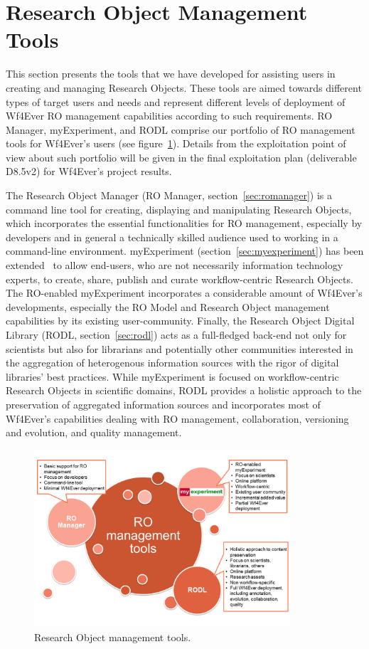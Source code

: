 \section{Research Object Management Tools}
\label{sec:romt}

This section presents the tools that we have developed for assisting users in creating and managing Research Objects. These tools are aimed towards different types of target users and needs and represent different levels of deployment of Wf4Ever RO management capabilities according to such requirements. RO Manager, myExperiment, and RODL comprise our portfolio of RO management tools for Wf4Ever's users (see figure~\ref{fig:romt}). Details from the exploitation point of view about such portfolio will be given in the final exploitation plan (deliverable D8.5v2) for Wf4Ever's project results.

The Research Object Manager (RO Manager, section~\ref{sec:romanager}) is a command line tool for creating, displaying and manipulating Research Objects, which incorporates the essential functionalities for RO management, especially by developers and in general a technically skilled audience used to working in a command-line environment. myExperiment (section~\ref{sec:myexperiment}) has been extended~\cite{DBLP:journals/fgcs/RoureGS09} to allow end-users, who are not necessarily information technology experts, to create, share, publish and curate workflow-centric Research Objects. The RO-enabled myExperiment incorporates a considerable amount of Wf4Ever's developments, especially the RO Model and Research Object management capabilities by its existing user-community. Finally, the Research Object Digital Library (RODL, section~\ref{sec:rodl}) acts as a full-fledged back-end not only for scientists but also for librarians and potentially other communities interested in the aggregation of heterogenous information sources with the rigor of digital libraries' best practices. While myExperiment is focused on workflow-centric Research Objects in scientific domains, RODL provides a holistic approach to the preservation of aggregated information sources and incorporates most of Wf4Ever's capabilities dealing with RO management, collaboration, versioning and evolution, and quality management. 


\begin{figure}
\begin{center}
\includegraphics[width=0.85\textwidth]{Figures/ROManagementTools-exploitation.png}
\end{center}
\caption{Research Object management tools.}
\label{fig:romt}
\end{figure}